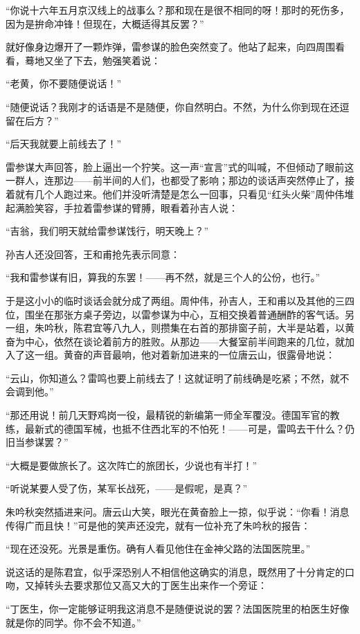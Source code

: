 \par “你说十六年五月京汉线上的战事么？那和现在是很不相同的呀！那时的死伤多，因为是拚命冲锋！但现在，大概适得其反罢？”
\par 就好像身边爆开了一颗炸弹，雷参谋的脸色突然变了。他站了起来，向四周围看看，蓦地又坐了下去，勉强笑着说：
\par “老黄，你不要随便说话！”
\par “随便说话？我刚才的话语是不是随便，你自然明白。不然，为什么你到现在还逗留在后方？”
\par “后天我就要上前线去了！”
\par 雷参谋大声回答，脸上逼出一个狞笑。这一声“宣言”式的叫喊，不但倾动了眼前这一群人，连那边——前半间的人们，也都受了影响；那边的谈话声突然停止了，接着就有几个人跑过来。他们并没听清楚是怎么一回事，只看见“红头火柴”周仲伟堆起满脸笑容，手拉着雷参谋的臂膊，眼看着孙吉人说：
\par “吉翁，我们明天就给雷参谋饯行，明天晚上？”
\par 孙吉人还没回答，王和甫抢先表示同意：
\par “我和雷参谋有旧，算我的东罢！——再不然，就是三个人的公份，也行。”
\par 于是这小小的临时谈话会就分成了两组。周仲伟，孙吉人，王和甫以及其他的三四位，围坐在那张方桌子旁边，以雷参谋为中心，互相交换着普通酬酢的客气话。另一组，朱吟秋，陈君宜等八九人，则攒集在右首的那排窗子前，大半是站着，以黄奋为中心，依然在谈论着前方的胜败。从那边——大餐室前半间跑来的几位，就加入了这一组。黄奋的声音最响，他对着新加进来的一位唐云山，很露骨地说：
\par “云山，你知道么？雷鸣也要上前线去了！这就证明了前线确是吃紧；不然，就不会调到他。”
\par “那还用说！前几天野鸡岗一役，最精锐的新编第一师全军覆没。德国军官的教练，最新式的德国军械，也抵不住西北军的不怕死！——可是，雷鸣去干什么？仍旧当参谋罢？”
\par “大概是要做旅长了。这次阵亡的旅团长，少说也有半打！”
\par “听说某要人受了伤，某军长战死，——是假呢，是真？”
\par 朱吟秋突然插进来问。唐云山大笑，眼光在黄奋脸上一掠，似乎说：“你看！消息传得广而且快！”可是他的笑声还没完，就有一位补充了朱吟秋的报告：
\par “现在还没死。光景是重伤。确有人看见他住在金神父路的法国医院里。”
\par 说这话的是陈君宜，似乎深恐别人不相信他这确实的消息，既然用了十分肯定的口吻，又掉转头去要求那位又高又大的丁医生出来作一个旁证：
\par “丁医生，你一定能够证明我这消息不是随便说说的罢？法国医院里的柏医生好像就是你的同学。你不会不知道。”
